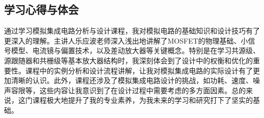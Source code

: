 %
%
%
%
%

\begin{appendices}

    
\section{学习心得与体会}

通过学习模拟集成电路分析与设计课程，我对模拟电路的基础知识和设计技巧有了更深入的理解。主讲人乐应波老师深入浅出地讲解了MOSFET的物理基础、小信号模型、电流镜与偏置技术，以及差动放大器等关键概念。特别是在学习共源级、源跟随器和共栅级等基本放大器结构时，我深刻体会到了设计中的权衡和优化的重要性。课程中的实例分析和设计流程讲解，让我对模拟集成电路的实际设计有了更加清晰的认识。此外，课程还涉及了模拟集成电路设计的挑战，如功耗、速度、噪声容限等，这些内容让我意识到了在设计过程中需要考虑的多方面因素。总的来说，这门课程极大地提升了我的专业素养，为我未来的学习和研究打下了坚实的基础。

\end{appendices}